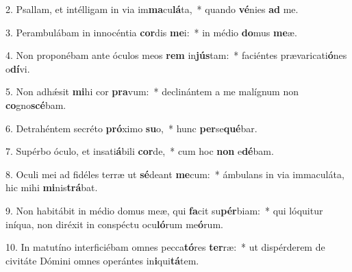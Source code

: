 2. Psallam, et intélligam in via im\textbf{ma}cu\textbf{lá}ta,~*  quando \textbf{vé}nies \textbf{ad} me.\

3. Perambulábam in innocéntia \textbf{cor}dis \textbf{me}i:~*  in médio \textbf{do}mus \textbf{me}æ.\

4. Non proponébam ante óculos meos \textbf{rem} in\textbf{jús}tam:~*  faciéntes prævaricati\textbf{ó}nes o\textbf{dí}vi.\

5. Non adhǽsit \textbf{mi}hi cor \textbf{pra}vum:~*  declinántem a me malígnum non \textbf{co}gno\textbf{scé}bam.\

6. Detrahéntem secréto \textbf{pró}ximo \textbf{su}o,~*  hunc \textbf{per}se\textbf{qué}bar.\

7. Supérbo óculo, et insati\textbf{á}bili \textbf{cor}de,~*  cum hoc \textbf{non} e\textbf{dé}bam.\

8. Oculi mei ad fidéles terræ ut \textbf{sé}deant \textbf{me}cum:~*  ámbulans in via immaculáta, hic mihi \textbf{mi}nis\textbf{trá}bat.\

9. Non habitábit in médio domus meæ, qui \textbf{fa}cit su\textbf{pér}biam:~*  qui lóquitur iníqua, non diréxit in conspéctu ocu\textbf{ló}rum me\textbf{ó}rum.\

10. In matutíno interficiébam omnes pecca\textbf{tó}res \textbf{ter}ræ:~*  ut dispérderem de civitáte Dómini omnes operántes in\textbf{i}qui\textbf{tá}tem.\

